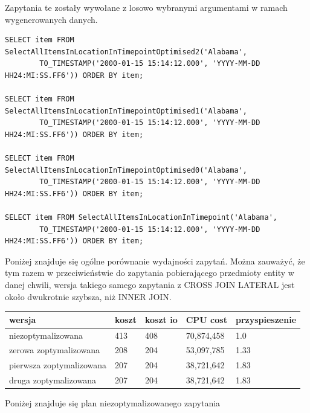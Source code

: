 \documentclass[11pt]{article}
\numberwithin{figure}{subsection}
\begin{document}
		Zapytania te zostały wywołane z losowo wybranymi argumentami w ramach
		wygenerowanych danych. \\
		
		\begin{lstlisting}[caption={Wywołanie zapytań}, captionpos=b]
SELECT item FROM SelectAllItemsInLocationInTimepointOptimised2('Alabama',
		TO_TIMESTAMP('2000-01-15 15:14:12.000', 'YYYY-MM-DD HH24:MI:SS.FF6')) ORDER BY item;

SELECT item FROM SelectAllItemsInLocationInTimepointOptimised1('Alabama',
		TO_TIMESTAMP('2000-01-15 15:14:12.000', 'YYYY-MM-DD HH24:MI:SS.FF6')) ORDER BY item;

SELECT item FROM SelectAllItemsInLocationInTimepointOptimised0('Alabama',
		TO_TIMESTAMP('2000-01-15 15:14:12.000', 'YYYY-MM-DD HH24:MI:SS.FF6')) ORDER BY item;

SELECT item FROM SelectAllItemsInLocationInTimepoint('Alabama',
		TO_TIMESTAMP('2000-01-15 15:14:12.000', 'YYYY-MM-DD HH24:MI:SS.FF6')) ORDER BY item;
		\end{lstlisting}
		
		Poniżej znajduje się ogólne porównanie wydajności zapytań. Można
		zauważyć, że tym razem w przeciwieństwie do zapytania pobierającego
		przedmioty entity w danej chwili, wersja takiego samego zapytania z
		CROSS JOIN LATERAL jest około dwukrotnie szybsza, niż INNER JOIN. \\
		
		\begin{tabularx}{\textwidth}{|X|X|X|X|X|}
			\hline
			wersja & koszt & koszt io & CPU cost & przyspieszenie \\
			\hline
			niezoptymalizowana & 413 & 408 & 70,874,458 & 1.0 \\
			\hline
			zerowa zoptymalizowana & 208 & 204 & 53,097,785 & 1.33 \\
			\hline
			pierwsza zoptymalizowana & 207 & 204 & 38,721,642 & 1.83 \\
			\hline
			druga zoptymalizowana & 207 & 204 & 38,721,642 & 1.83 \\
			\hline
		\end{tabularx}
		
		Poniżej znajduje się plan niezoptymalizowanego zapytania \\
		
\end{document}
